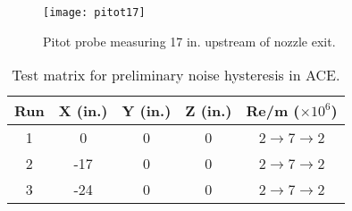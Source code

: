 \begin{figure}[ht]
    \centering
    \texttt{[image: pitot17]}
    \caption{Pitot probe measuring 17 in. upstream of nozzle exit.}
    \label{fig:pitot17}
\end{figure}

\begin{table}[ht]
    \centering
    \label{tab:ace-survey}
    \begin{tabular}{|c|c|c|c|c|}
        \hline
    \textbf{Run} & \textbf{X (in.)} & \textbf{Y (in.)} & \textbf{Z (in.)} & \textbf{Re/m ($\times10^6$)} \\ \hline
        1 & 0 & 0 & 0 & 2$\to$7$\to$2 \\ \hline
        2 & -17 & 0 & 0 & 2$\to$7$\to$2 \\ \hline
        3 & -24 & 0 & 0 & 2$\to$7$\to$2 \\ \hline
    \end{tabular}
    \caption{Test matrix for preliminary noise hysteresis in ACE.}
\end{table}

